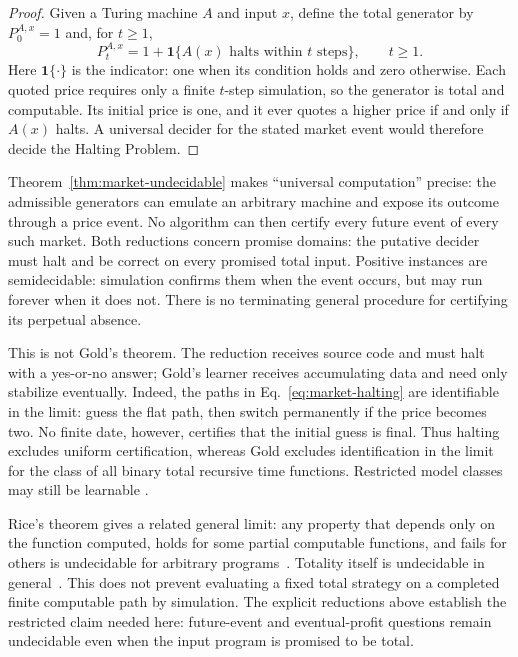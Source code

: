 \documentclass[aps,pra,reprint,superscriptaddress,amsmath,amssymb,floatfix]{revtex4-2}
\theoremstyle{plain}
\theoremstyle{definition}
\theoremstyle{remark}
\begin{document}
\begin{proof}
Given a Turing machine \(A\) and input \(x\), define the total generator by
\(P_0^{A,x}=1\) and, for \(t\geq1\),
\begin{equation}
  P_t^{A,x}
  =1+\mathbf{1}\{A(x)\text{ halts within }t\text{ steps}\},
  \qquad t\geq1 .
  \label{eq:market-halting}
\end{equation}
Here \(\mathbf{1}\{\cdot\}\) is the indicator: one when its condition holds
and zero otherwise. Each quoted price requires only a finite \(t\)-step
simulation, so the generator is total and computable. Its initial price is one, and it ever quotes
a higher price if and only if \(A(x)\) halts. A universal decider for the stated
market event would therefore decide the Halting Problem.
\end{proof}

Theorem~\ref{thm:market-undecidable} makes ``universal computation'' precise:
the admissible generators can emulate an arbitrary machine and expose its
outcome through a price event. No algorithm can then certify every future
event of every such market. Both reductions concern promise domains: the
putative decider must halt and be correct on every promised total input.
Positive instances are semidecidable: simulation confirms them when the event
occurs, but may run forever when it does not. There is no terminating general
procedure for certifying its perpetual absence.

This is not Gold's theorem. The reduction receives source code and must halt
with a yes-or-no answer; Gold's learner receives accumulating data and need
only stabilize eventually. Indeed, the paths in
Eq.~\eqref{eq:market-halting} are identifiable in the limit: guess the flat
path, then switch permanently if the price becomes two. No finite date,
however, certifies that the initial guess is final. Thus halting excludes
uniform certification, whereas Gold excludes identification in the limit for
the class of all binary total recursive time functions. Restricted model
classes may still be learnable
\cite{blum75blum,angluin:83,ad-91,2016-AlexanderKarlSvozil-ml,moore}.

Rice's theorem gives a related general limit: any property that depends only
on the function computed, holds for some partial computable functions, and
fails for others is undecidable for arbitrary programs~\cite{Rice-1953}.
Totality itself is undecidable in general~\cite{turing-36}. This does not
prevent evaluating a fixed total strategy on a completed finite computable
path by simulation. The explicit reductions above establish the restricted
claim needed here: future-event and eventual-profit questions remain
undecidable even when the input program is promised to be total.
\end{document}
